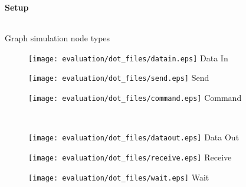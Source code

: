 \begin{frame}[fragile]
    \frametitle{\EvaluationTitle}
    \framesubtitle{Setup}
    \begin{columns}
        \begin{column}{0.45\textwidth}
            \centering
            Graph simulation node types\\
            \begin{figure}
                \centering
                \begin{minipage}{0.33\textwidth}
                    \centering
                    \texttt{[image: evaluation/dot\_files/datain.eps]}
                    Data In
                    \label{fig:packet_graph_datain}
                \end{minipage}%
                \begin{minipage}{0.33\textwidth}
                    \centering
                    \texttt{[image: evaluation/dot\_files/send.eps]}
                    Send
                    \label{fig:packet_graph_send}
                \end{minipage}%
                \begin{minipage}{0.33\textwidth}
                    \centering
                    \texttt{[image: evaluation/dot\_files/command.eps]}
                    Command
                    \label{fig:packet_graph_command}
                \end{minipage}%
                \\
                \begin{minipage}{0.33\textwidth}
                    \centering
                    \texttt{[image: evaluation/dot\_files/dataout.eps]}
                    Data Out
                    \label{fig:packet_graph_dataout}
                \end{minipage}%
                \begin{minipage}{0.33\textwidth}
                    \centering
                    \texttt{[image: evaluation/dot\_files/receive.eps]}
                    Receive
                    \label{fig:packet_graph_receive}
                \end{minipage}%
                \begin{minipage}{0.33\textwidth}
                    \centering
                    \texttt{[image: evaluation/dot\_files/wait.eps]}
                    Wait
                    \label{fig:packet_graph_wait}
                \end{minipage}%
            \end{figure}%

\end{column}
\end{columns}
\end{frame}
